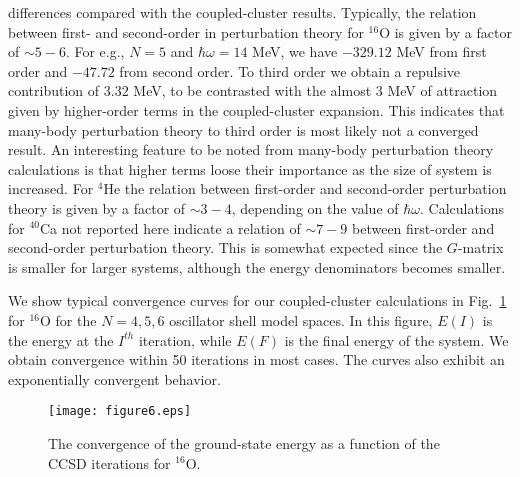 \documentclass[aps,prc,twocolumn,floatfix]{revtex4}
\begin{document}
differences compared with the coupled-cluster results.
Typically, the relation between first- and second-order in perturbation theory
for  $^{16}$O is given by a factor of $\sim 5-6$. For e.g., $N=5$ and 
$\hbar\omega=14$ MeV, we have $-329.12$ MeV from first order and $-47.72$
from second order. To third order we obtain a repulsive contribution of
$3.32$ MeV, to be contrasted with the almost $3$ MeV of attraction given 
by higher-order terms in the coupled-cluster expansion. This indicates that
many-body perturbation theory to third order is
most likely not a converged result. An interesting feature to be noted from
many-body perturbation theory calculations is that higher terms loose their
importance as the size of system is increased. For 
$^{4}$He the relation between first-order and second-order perturbation theory
is given by a factor of $\sim 3-4$, depending on the value of $\hbar\omega$.
Calculations for $^{40}$Ca not reported here indicate a relation of
$\sim 7-9$ between first-order and second-order perturbation theory.
This is somewhat expected since the $G$-matrix is smaller for larger
systems, although the energy denominators becomes smaller.  

We show typical convergence curves for our coupled-cluster calculations 
in Fig.~\ref{converge_fig} for $^{16}$O for the $N=4,5,6$ oscillator
shell model spaces. In this figure, $E(I)$ is the energy at the $I^{th}$
iteration, while $E(F)$ is the final energy of the system. We obtain
convergence within 50 iterations in most cases. The curves also 
exhibit an exponentially convergent behavior. 

\begin{figure}
\vspace{0.25in}
\texttt{[image: figure6.eps]}
\caption{The convergence of the ground-state energy
as a function of the CCSD iterations for $^{16}$O.}
\label{converge_fig}
\end{figure}
\end{document}
